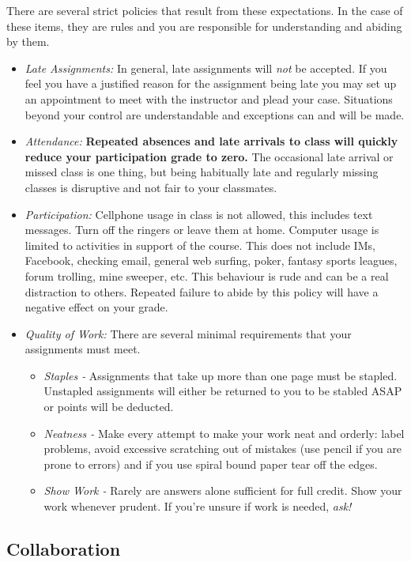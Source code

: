 \documentclass[10pt]{article}
\begin{document}
There are several strict policies that result from these expectations.  In the case of these items, they are rules and you are responsible for understanding and abiding by them.
\begin{itemize}
\item \textit{Late Assignments: }In general, late assignments will \textit{not} be accepted.  If you feel you have a justified reason for the assignment being late you may set up an appointment to meet with the instructor and plead your case.  Situations beyond your control are understandable and exceptions can and will be made.
\item \textit{Attendance: } \textbf{Repeated absences and late arrivals to class will quickly reduce your participation grade to zero.}  The occasional late arrival or missed class is one thing, but being habitually late and regularly missing classes is disruptive and not fair to your classmates.  
\item \textit{Participation: }  Cellphone usage in class is not allowed, this includes text messages.  Turn off the ringers or leave them at home.  Computer usage is limited to activities in support of the course.  This does not include IMs, Facebook, checking email, general web surfing, poker, fantasy sports leagues, forum trolling, mine sweeper, etc.  This behaviour is rude and can be a real distraction to others.  Repeated failure to abide by this policy will have a negative effect on your grade.  
\item \textit{Quality of Work:} There are several minimal requirements that your assignments must meet.
\begin{itemize}
\item \textit{Staples - } Assignments that take up more than one page must be stapled.  Unstapled assignments will either be returned to you to be stabled ASAP or points will be deducted.  
\item \textit{Neatness - }  Make every attempt to make your work neat and orderly:  label problems, avoid excessive scratching out of mistakes (use pencil if you are prone to errors) and if you use spiral bound paper tear off the edges. 
\item \textit{Show Work - } Rarely are answers alone sufficient for full credit.  Show your work whenever prudent.  If you're unsure if work is needed, \textit{ask!}
\end{itemize}
\end{itemize}

\subsection{Collaboration}
\end{document}
